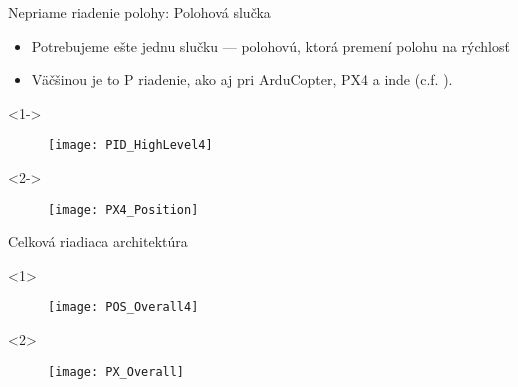   
   \begin{frame}[t]{Nepriame riadenie polohy: Polohová slučka}
\begin{itemize}
  \item<1-> Potrebujeme ešte jednu slučku --- polohovú, ktorá premení polohu na rýchlosť

  \item<2-> Väčšinou je to P riadenie, ako aj pri ArduCopter, PX4 a inde (c.f. \cite{Saha2020}).
\end{itemize}

  \begin{onlyenv}<1->
  \begin{figure}
\centering
  \texttt{[image: PID\_HighLevel4]}\\
\end{figure}
\end{onlyenv}


  \begin{onlyenv}<2->
  \begin{figure}
\centering
  \texttt{[image: PX4\_Position]}\\
\end{figure}
\end{onlyenv}
  \end{frame}
  
 \begin{frame}[t]{Celková riadiaca architektúra}
  \begin{onlyenv}<1>
  \begin{figure}
\centering
  \texttt{[image: POS\_Overall4]}\\
\end{figure}
\end{onlyenv}

  \begin{onlyenv}<2>
  \begin{figure}
\centering
  \texttt{[image: PX\_Overall]}\\
\end{figure}
\end{onlyenv}

  \end{frame}
  
  

